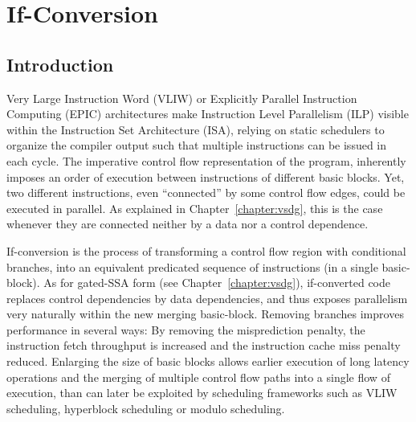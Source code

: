  \chapter{If-Conversion }\label{chapter:if_conversion}
\label{chapter:if_conversion}
\graphicspath{{img/}{if_conversion/img/}{part4/if_conversion/img/}}

\newcommand{\annotation}[1]{%
  \marginpar{\small\itshape\color{red}#1}}



\section{Introduction}

Very Large Instruction Word (VLIW) or Explicitly Parallel Instruction Computing (EPIC) architectures make Instruction Level Parallelism (ILP) visible within the Instruction Set Architecture (ISA), relying on static schedulers to organize the compiler output such that multiple instructions can be issued in each cycle.
The imperative control flow representation of the program, inherently imposes an order of execution between instructions of different basic blocks. Yet, two different instructions, even ``connected'' by some control flow edges, could be executed in parallel. As explained in Chapter~\ref{chapter:vsdg}, this is the case whenever they are connected neither by a data nor a control dependence. 

If-conversion is the process of transforming a control flow region with conditional branches, into an equivalent predicated sequence of instructions (in a single basic-block). As for gated-SSA form (see Chapter~\ref{chapter:vsdg}), if-converted code replaces control dependencies by data dependencies, and thus exposes parallelism very naturally within the new merging basic-block. 
Removing branches improves performance in several ways: By removing the misprediction penalty, the instruction fetch throughput is increased and the instruction cache miss penalty reduced. Enlarging the size of basic blocks allows earlier execution of long latency operations and the merging of multiple control flow paths into a single flow of execution, than can later be exploited by scheduling frameworks such as VLIW scheduling, hyperblock scheduling or modulo scheduling.


